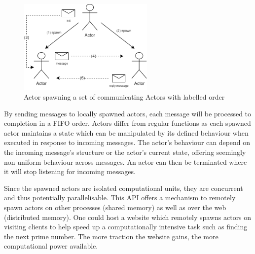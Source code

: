 \documentclass[12pt, a4paper]{report}
\theoremstyle{definition}
\theoremstyle{definition}%
\theoremstyle{definition}%
\theoremstyle{definition}%
\theoremstyle{definition}%
\theoremstyle{definition}%
\begin{document}
\begin{figure}[H]
    \begin{centering}
        \includegraphics[width=250px]{resources/actors.png}
        \caption{Actor spawning a set of communicating Actors with labelled order}
    \end{centering}
\end{figure}

By sending messages to locally spawned actors, each message will be processed to completion in a FIFO order. Actors differ from regular functions as each spawned actor maintains a state which can be manipulated by its defined behaviour when executed in response to incoming messages. The actor’s behaviour can depend on the incoming message’s structure or the actor’s current state, offering seemingly non-uniform behaviour across messages. An actor can then be terminated where it will stop listening for incoming messages.

Since the spawned actors are isolated computational units, they are concurrent and thus potentially parallelisable. This API offers a mechanism to remotely spawn actors on other processes (shared memory) as well as over the web (distributed memory). One could host a website which remotely spawns actors on visiting clients to help speed up a computationally intensive task such as finding the next prime number. The more traction the website gains, the more computational power available.
\end{document}
